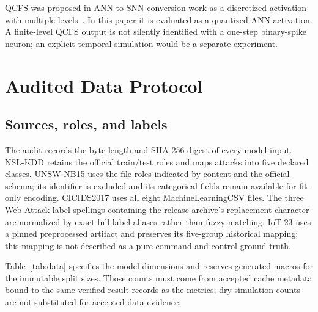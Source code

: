 \documentclass[10pt,conference]{IEEEtran}
\begin{document}
QCFS was proposed in ANN-to-SNN conversion work as a discretized activation
with multiple levels~\cite{bu2022optimal,jiang2023unified}. In this paper it
is evaluated as a quantized ANN activation. A finite-level QCFS output is not
silently identified with a one-step binary-spike neuron; an explicit temporal
simulation would be a separate experiment.

\section{Audited Data Protocol}

\subsection{Sources, roles, and labels}

The audit records the byte length and SHA-256 digest of every model input.
NSL-KDD retains the official train/test roles and maps attacks into five
declared classes. UNSW-NB15 uses the file roles indicated by content and the
official schema; its identifier is excluded and its categorical fields remain
available for fit-only encoding. CICIDS2017 uses all eight MachineLearningCSV
files. The three Web Attack label spellings containing the release archive's
replacement character are normalized by exact full-label aliases rather than
fuzzy matching. IoT-23 uses a pinned preprocessed artifact and preserves its
five-group historical mapping; this mapping is not described as a pure
command-and-control ground truth.

Table~\ref{tab:data} specifies the model dimensions and reserves generated
macros for the immutable split sizes. Those counts must come from accepted
cache metadata bound to the same verified result records as the metrics;
dry-simulation counts are not substituted for accepted data evidence.

\begin{table}[t]
\centering
\caption{Version-5 unique-pattern splits. NSL-KDD and UNSW-NB15 retain official
roles with overlapping test components excluded; CICIDS2017 and IoT-23 use
fixed exact-input-group-disjoint splits.}
\label{tab:data}
\small
{}
\end{table}
\end{document}
